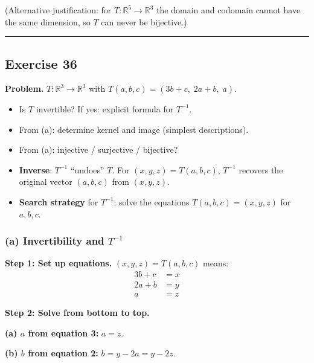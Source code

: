 \documentclass[a4paper,12pt]{article}
\begin{document}
(Alternative justification: for $T \colon \mathbb{R}^5 \to \mathbb{R}^3$ the domain and codomain cannot have the same dimension, so $T$ can never be bijective.)

\bigskip
\hrule
\bigskip

\subsection*{Exercise 36}

\textbf{Problem.} $T \colon \mathbb{R}^3 \to \mathbb{R}^3$ with $T(a, b, c) = (3b + c,\; 2a + b,\; a)$.
\begin{itemize}[nosep]
\item[(a)] Is $T$ invertible? If yes: explicit formula for $T^{-1}$.
\item[(b)] From (a): determine kernel and image (simplest descriptions).
\item[(c)] From (a): injective / surjective / bijective?
\end{itemize}

\begin{begriffe}
\begin{itemize}[leftmargin=*, nosep]
    \item \textbf{Inverse}: $T^{-1}$ ``undoes'' $T$. For $(x, y, z) = T(a, b, c)$, $T^{-1}$ recovers the original vector $(a, b, c)$ from $(x, y, z)$.
    \item \textbf{Search strategy} for $T^{-1}$: solve the equations $T(a, b, c) = (x, y, z)$ for $a, b, c$.
\end{itemize}
\end{begriffe}

\subsubsection*{(a) Invertibility and $T^{-1}$}

\textbf{Step 1: Set up equations.} $(x, y, z) = T(a, b, c)$ means:
\begin{align*}
3b + c &= x \\
2a + b &= y \\
a &= z
\end{align*}

\textbf{Step 2: Solve from bottom to top.}

\textbf{(a) $a$ from equation 3:} $a = z$.

\textbf{(b) $b$ from equation 2:} $b = y - 2a = y - 2z$.
\end{document}
